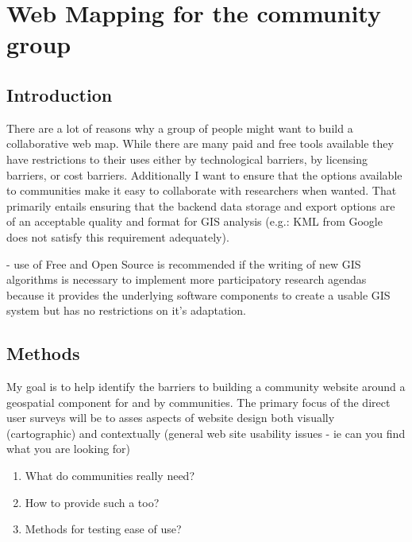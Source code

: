 \documentclass[12pt,letterpaper]{article}
\begin{document}
%

\section{Web Mapping for the community group}
\subsection{Introduction}
	



	There are a lot of reasons why a group of people might want to build a collaborative web map. While there are many paid and free tools available they have restrictions to their uses either by technological barriers, by licensing barriers, or cost barriers. Additionally I want to ensure that the options available to communities make it easy to collaborate with researchers when wanted. That primarily entails ensuring that the backend data storage and export options are of an acceptable quality and format for GIS analysis (e.g.: KML from Google does not satisfy this requirement adequately).
	
\parencite{Dunn2007} - use of Free and Open Source is recommended if the writing of new GIS algorithms is necessary to implement more participatory research agendas because it provides the underlying software components to create a usable GIS system but has no restrictions on it's adaptation.

\subsection{Methods}
My goal is to help identify the barriers to building a community website around a geospatial component for and by communities. The primary focus of the direct user surveys will be to asses aspects of website design both visually (cartographic) and contextually (general web site usability issues - ie can you find what you are looking for)
\begin{enumerate}
\item What do communities really need?
\item How to provide such a too?
\item Methods for testing ease of use?
\end{enumerate}
\end{document}
